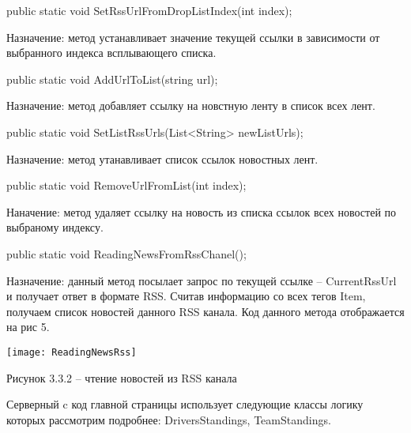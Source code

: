 \documentclass[14pt,a4paper]{extreport}
\begin{document}
public static void SetRssUrlFromDropListIndex(int index);\par
Назначение: метод устанавливает значение текущей ссылки в зависимости от выбранного индекса всплывающего списка.\par
   \par
public static void AddUrlToList(string url);\par
Назначение: метод добавляет ссылку на новстную ленту в список всех лент.\par
   \par
public static void SetListRssUrls(List<String> newListUrls);\par
Назначение: метод утанавливает список ссылок новостных лент.\par
   \par
public static void RemoveUrlFromList(int index);\par
Наначение: метод удаляет ссылку на новость из списка ссылок всех новостей по выбраному индексу.\par
   \par
public static void ReadingNewsFromRssChanel();\par
Назначение: данный метод посылает запрос по текущей ссылке – CurrentRssUrl и получает ответ в формате RSS. Считав информацию со всех тегов Item, получаем список новостей данного RSS канала. Код данного метода отображается на рис 5.\par
	\texttt{[image: ReadingNewsRss]}\par   
           \center Рисунок 3.3.2 – чтение новостей из RSS канала \par
\flushleft\parindent=1cm Серверный c код главной страницы использует следующие классы логику которых рассмотрим подробнее: DriversStandings, TeamStandings.\par
	
\end{document}

